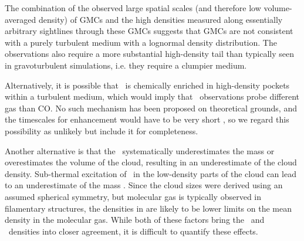 
The combination of the observed large spatial scales (and therefore low
volume-averaged density) of GMCs and the high densities measured along
essentially arbitrary sightlines through these GMCs suggests that GMCs are not
consistent with a purely turbulent medium with a lognormal density
distribution.  The observations also require a more substantial high-density
tail than typically seen in gravoturbulent simulations, i.e. they require a
clumpier medium.

Alternatively, it is possible that \formaldehyde\ is chemically enriched in
high-density pockets within a turbulent medium, which would imply that
\formaldehyde\ observations probe different gas than CO.  No such mechanism has
been proposed on theoretical grounds, and the timescales for enhancement would
have to be very short \citep[intermittent density enhancement occurs on
timescales much shorter than the dynamical timescale; ][]{Kritsuk2007}, so we
regard this possibility as unlikely but include it for completeness.

Another alternative is that the \thirteenco\ systematically underestimates the
mass or overestimates the volume of the cloud, resulting in an underestimate of
the cloud density.  Sub-thermal excitation of \thirteenco\ in the low-density
parts of the cloud can lead to an underestimate of the mass \citep[][Section
9.3]{Roman-Duval2010}.  Since the cloud sizes were derived using an assumed
spherical symmetry, but molecular gas is typically observed in filamentary
structures, the densities in \citet{Roman-Duval2010} are likely to be lower
limits on the mean density in the molecular gas.  While both of these factors
bring the \formaldehyde\ and \thirteenco\ densities into closer agreement, it
is difficult to quantify these effects.


